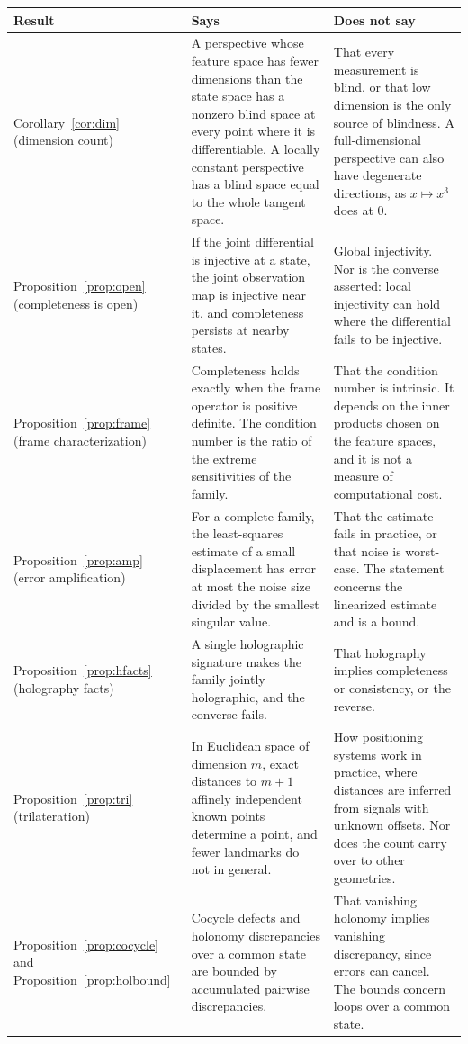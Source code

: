 \documentclass[11pt]{article}
\theoremstyle{remark}
\begin{document}
\begin{longtable}{@{}p{2.7cm}p{6.0cm}p{6.0cm}@{}}
\hline
\textbf{Result} & \textbf{Says} & \textbf{Does not say}\\
\hline
\endhead
Corollary~\ref{cor:dim} (dimension count) & A perspective whose feature space has fewer dimensions than the state space has a nonzero blind space at every point where it is differentiable. A locally constant perspective has a blind space equal to the whole tangent space. & That every measurement is blind, or that low dimension is the only source of blindness. A full-dimensional perspective can also have degenerate directions, as $x\mapsto x^3$ does at $0$.\\
Proposition~\ref{prop:open} (completeness is open) & If the joint differential is injective at a state, the joint observation map is injective near it, and completeness persists at nearby states. & Global injectivity. Nor is the converse asserted: local injectivity can hold where the differential fails to be injective.\\
Proposition~\ref{prop:frame} (frame characterization) & Completeness holds exactly when the frame operator is positive definite. The condition number is the ratio of the extreme sensitivities of the family. & That the condition number is intrinsic. It depends on the inner products chosen on the feature spaces, and it is not a measure of computational cost.\\
Proposition~\ref{prop:amp} (error amplification) & For a complete family, the least-squares estimate of a small displacement has error at most the noise size divided by the smallest singular value. & That the estimate fails in practice, or that noise is worst-case. The statement concerns the linearized estimate and is a bound.\\
Proposition~\ref{prop:hfacts} (holography facts) & A single holographic signature makes the family jointly holographic, and the converse fails. & That holography implies completeness or consistency, or the reverse.\\
Proposition~\ref{prop:tri} (trilateration) & In Euclidean space of dimension $m$, exact distances to $m+1$ affinely independent known points determine a point, and fewer landmarks do not in general. & How positioning systems work in practice, where distances are inferred from signals with unknown offsets. Nor does the count carry over to other geometries.\\
Proposition~\ref{prop:cocycle} and Proposition~\ref{prop:holbound} & Cocycle defects and holonomy discrepancies over a common state are bounded by accumulated pairwise discrepancies. & That vanishing holonomy implies vanishing discrepancy, since errors can cancel. The bounds concern loops over a common state.\\

\end{longtable}
\end{document}
